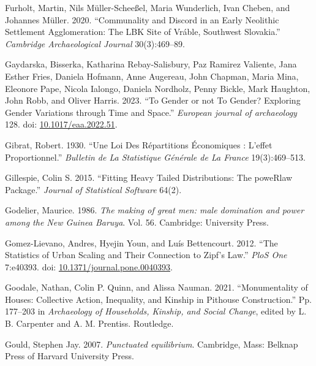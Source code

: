 \documentclass[
  12pt,
]{book}
\newlength{\cslhangindent}
\newlength{\cslentryspacingunit} %
\newenvironment{CSLReferences}[2] %
 {%
  \setlength{\parindent}{0pt}
  \ifodd #1
  \let\oldpar\par
  \def\par{\hangindent=\cslhangindent\oldpar}
  \fi
  \setlength{\parskip}{#2\cslentryspacingunit}
 }%
 {}
\begin{document}
\begin{CSLReferences}{1}{0}
\leavevmode{}%
Furholt, Martin, Nils Müller-Scheeßel, Maria Wunderlich, Ivan Cheben, and Johannes Müller. 2020. {``Communality and Discord in an Early Neolithic Settlement Agglomeration: The LBK Site of Vráble, Southwest Slovakia.''} \emph{Cambridge Archaeological Journal} 30(3):469--89.

\leavevmode{}%
Gaydarska, Bisserka, Katharina Rebay-Salisbury, Paz Ramirez Valiente, Jana Esther Fries, Daniela Hofmann, Anne Augereau, John Chapman, Maria Mina, Eleonore Pape, Nicola Ialongo, Daniela Nordholz, Penny Bickle, Mark Haughton, John Robb, and Oliver Harris. 2023. {``To Gender or not To Gender? Exploring Gender Variations through Time and Space.''} \emph{European journal of archaeology} 128. doi: \href{https://doi.org/10.1017/eaa.2022.51}{10.1017/eaa.2022.51}.

\leavevmode{}%
Gibrat, Robert. 1930. {``Une Loi Des Répartitions Économiques : L'effet Proportionnel.''} \emph{Bulletin de La Statistique Générale de La France} 19(3):469--513.

\leavevmode{}%
Gillespie, Colin S. 2015. {``Fitting Heavy Tailed Distributions: The poweRlaw Package.''} \emph{Journal of Statistical Software} 64(2).

\leavevmode{}%
Godelier, Maurice. 1986. \emph{The making of great men: male domination and power among the New Guinea Baruya}. Vol. 56. Cambridge: University Press.

\leavevmode{}%
Gomez-Lievano, Andres, Hyejin Youn, and Luís Bettencourt. 2012. {``The Statistics of Urban Scaling and Their Connection to Zipf{'}s Law.''} \emph{PloS One} 7:e40393. doi: \href{https://doi.org/10.1371/journal.pone.0040393}{10.1371/journal.pone.0040393}.

\leavevmode{}%
Goodale, Nathan, Colin P. Quinn, and Alissa Nauman. 2021. {``Monumentality of Houses: {Collective} Action, Inequality, and Kinship in Pithouse Construction.''} Pp. 177--203 in \emph{Archaeology of {Households}, {Kinship}, and {Social Change}}, edited by L. B. Carpenter and A. M. Prentiss. {Routledge}.

\leavevmode{}%
Gould, Stephen Jay. 2007. \emph{Punctuated equilibrium}. Cambridge, Mass: Belknap Press of Harvard University Press.


\end{CSLReferences}
\end{document}
